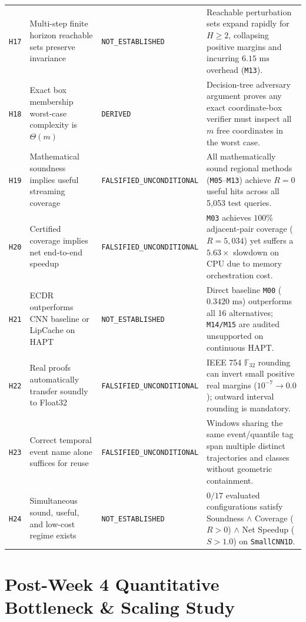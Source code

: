 \documentclass[11pt,a4paper]{article}
\newcommand{\F}{\mathbb{F}}
\newcommand{\code}[1]{{\small\ttfamily\nolinkurl{#1}}}
\theoremstyle{remark}
\begin{document}
{\begin{longtable}{@{}p{0.8cm}p{4.3cm}p{2.9cm}p{7.2cm}@{}}
\code{H17} & Multi-step finite horizon reachable sets preserve invariance & \code{NOT\_ESTABLISHED} & Reachable perturbation sets expand rapidly for $H \ge 2$, collapsing positive margins and incurring $6.15\text{ ms}$ overhead (\code{M13}). \\
\code{H18} & Exact box membership worst-case complexity is $\Theta(m)$ & \code{DERIVED} & Decision-tree adversary argument proves any exact coordinate-box verifier must inspect all $m$ free coordinates in the worst case. \\
\code{H19} & Mathematical soundness implies useful streaming coverage & \code{FALSIFIED\_UNCONDITIONAL} & All mathematically sound regional methods (\code{M05}--\code{M13}) achieve $R = 0$ useful hits across all 5,053 test queries. \\
\code{H20} & Certified coverage implies net end-to-end speedup & \code{FALSIFIED\_UNCONDITIONAL} & \code{M03} achieves $100\%$ adjacent-pair coverage ($R=5,034$) yet suffers a $5.63\times$ slowdown on CPU due to memory orchestration cost. \\
\code{H21} & ECDR outperforms CNN baseline or LipCache on HAPT & \code{NOT\_ESTABLISHED} & Direct baseline \code{M00} ($0.3420\text{ ms}$) outperforms all 16 alternatives; \code{M14/M15} are audited unsupported on continuous HAPT. \\
\code{H22} & Real proofs automatically transfer soundly to Float32 & \code{FALSIFIED\_UNCONDITIONAL} & IEEE 754 $\F_{32}$ rounding can invert small positive real margins ($10^{-7} \to 0.0$); outward interval rounding is mandatory. \\
\code{H23} & Correct temporal event name alone suffices for reuse & \code{FALSIFIED\_UNCONDITIONAL} & Windows sharing the same event/quantile tag span multiple distinct trajectories and classes without geometric containment. \\
\code{H24} & Simultaneous sound, useful, and low-cost regime exists & \code{NOT\_ESTABLISHED} & $0/17$ evaluated configurations satisfy Soundness $\land$ Coverage ($R>0$) $\land$ Net Speedup ($S>1.0$) on \code{SmallCNN1D}. \\
\end{longtable}
}

\section{Post-Week 4 Quantitative Bottleneck \& Scaling Study}
\end{document}
